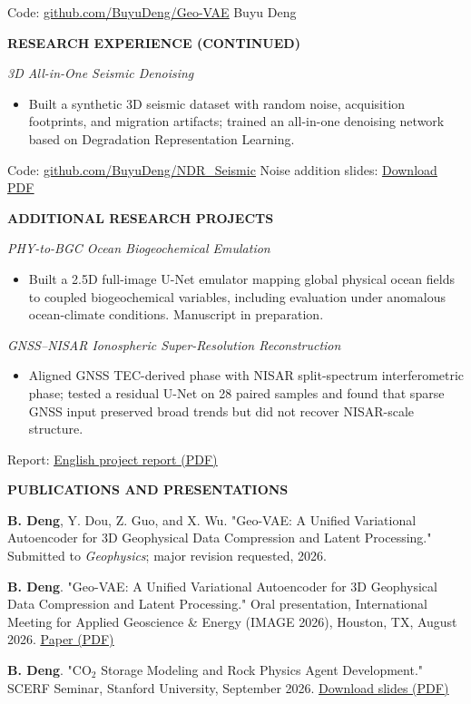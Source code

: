 \documentclass[10pt,letterpaper]{article}
\newcommand{\cvsection}[1]{\vspace{0.85em}\begin{center}\bfseries\MakeUppercase{#1}\end{center}\vspace{-0.7em}}
\newcommand{\cvproject}[1]{\par\vspace{0.42em}\textit{#1}\par}
\newcommand{\cvlist}[1]{\begin{itemize}#1\end{itemize}}
\newcommand{\cvlink}[2]{\href{#1}{\underline{#2}}}
\begin{document}
Code: \cvlink{https://github.com/BuyuDeng/Geo-VAE}{github.com/BuyuDeng/Geo-VAE}
\newpage
\noindent\hfill Buyu Deng \par
\cvsection{Research Experience (continued)}
\cvproject{3D All-in-One Seismic Denoising}
\cvlist{
  \item Built a synthetic 3D seismic dataset with random noise, acquisition footprints, and migration artifacts; trained an all-in-one denoising network based on Degradation Representation Learning.
}
Code: \cvlink{https://github.com/BuyuDeng/NDR_Seismic}{github.com/BuyuDeng/NDR\_Seismic}
\quad Noise addition slides: \cvlink{https://buyudeng.github.io/Noise_Addition.pdf}{Download PDF}\par
\cvsection{Additional Research Projects}
\cvproject{PHY-to-BGC Ocean Biogeochemical Emulation}
\cvlist{
  \item Built a 2.5D full-image U-Net emulator mapping global physical ocean fields to coupled biogeochemical variables, including evaluation under anomalous ocean-climate conditions. Manuscript in preparation.
}
\cvproject{GNSS--NISAR Ionospheric Super-Resolution Reconstruction}
\cvlist{
  \item Aligned GNSS TEC-derived phase with NISAR split-spectrum interferometric phase; tested a residual U-Net on 28 paired samples and found that sparse GNSS input preserved broad trends but did not recover NISAR-scale structure.
}
Report: \cvlink{https://buyudeng.github.io/GNSS_NISAR_English_Report.pdf}{English project report (PDF)}\par
\cvsection{Publications and Presentations}
\textbf{B. Deng}, Y. Dou, Z. Guo, and X. Wu. "Geo-VAE: A Unified Variational Autoencoder for 3D Geophysical Data Compression and Latent Processing." Submitted to \textit{Geophysics}; major revision requested, 2026.\par\vspace{0.3em}
\textbf{B. Deng}. "Geo-VAE: A Unified Variational Autoencoder for 3D Geophysical Data Compression and Latent Processing." Oral presentation, International Meeting for Applied Geoscience \& Energy (IMAGE 2026), Houston, TX, August 2026. \cvlink{https://image2026.abstractcentral.com/viewer?TAG_ACTION=SECURE_FILE_DOWNLOAD&VIEW_FILE_KEY=voX17U5KaZjgB38snVPk6aXmQjTECAtW16CqoaV9C8VNwSsAa8pB8295kDjV8QcW9UKzVTvUMEN7qzzsSjr8LNCaaqxz7dsKV9}{Paper (PDF)}\par\vspace{0.3em}
\textbf{B. Deng}. "CO$_2$ Storage Modeling and Rock Physics Agent Development." SCERF Seminar, Stanford University, September 2026. \cvlink{https://buyudeng.github.io/Final_Presentation.pdf}{Download slides (PDF)}\par\vspace{0.3em}
\end{document}
